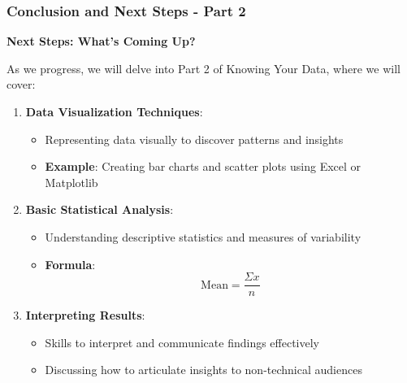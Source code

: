 \documentclass[aspectratio=169]{beamer}
\begin{document}
\begin{frame}[fragile]
    \frametitle{Conclusion and Next Steps - Part 2}
    \textbf{Next Steps: What’s Coming Up?}
    
    As we progress, we will delve into Part 2 of Knowing Your Data, where we will cover:
    
    \begin{enumerate}
        \item \textbf{Data Visualization Techniques}:
            \begin{itemize}
                \item Representing data visually to discover patterns and insights
                \item \textbf{Example}: Creating bar charts and scatter plots using Excel or Matplotlib
            \end{itemize}
        
        \item \textbf{Basic Statistical Analysis}:
            \begin{itemize}
                \item Understanding descriptive statistics and measures of variability
                \item \textbf{Formula}:
                    \begin{equation}
                        \text{Mean} = \frac{\Sigma x}{n}
                    \end{equation}
                \end{itemize}
        
        \item \textbf{Interpreting Results}:
            \begin{itemize}
                \item Skills to interpret and communicate findings effectively
                \item Discussing how to articulate insights to non-technical audiences
            \end{itemize}
    \end{enumerate}
\end{frame}
\end{document}
